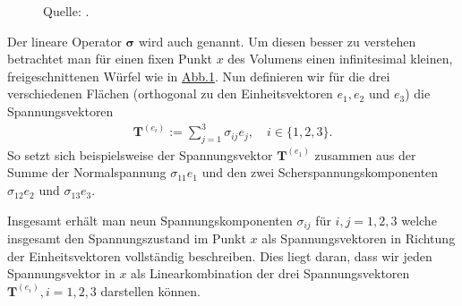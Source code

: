 \documentclass[letterpaper,10pt,german]{jupyterBook}
\let\sphinxpxdimen\pdfpxdimen\else\newdimen\sphinxpxdimen
\begin{document}
\begin{figure}[htbp]
\centering
\capstart

\noindent\sphinxincludegraphics[height=250\sphinxpxdimen]{{stress_tensor_comp}.png}
\caption{Quelle: .}\label{\detokenize{vektoranalysis/tensor:fig-stress-comp}}\end{figure}

\sphinxAtStartPar
Der lineare Operator \(\mathbf{\sigma}\) wird auch  genannt.
Um diesen besser zu verstehen betrachtet man für einen fixen Punkt \(x\) des Volumens einen infinitesimal kleinen, freigeschnittenen Würfel wie in \hyperref[\detokenize{vektoranalysis/tensor:fig-stress-comp}]{Abb.\@ \ref{\detokenize{vektoranalysis/tensor:fig-stress-comp}}}.
Nun definieren wir für die drei verschiedenen Flächen (orthogonal zu den Einheitsvektoren \(e_1, e_2\) und \(e_3\)) die Spannungsvektoren
\begin{equation*}
\begin{split}\mathbf{T}^{(e_i)}:= \sum_{j=1}^3 \sigma_{ij} e_j, \quad i \in \lbrace 1,2,3 \rbrace.\end{split}
\end{equation*}
\sphinxAtStartPar
So setzt sich beispielsweise der Spannungsvektor \(\mathbf{T}^{(e_1)}\) zusammen aus der Summe der Normalspannung \(\sigma_{11} e_1\) und den zwei Scherspannungskomponenten \(\sigma_{12} e_2\) und \(\sigma_{13} e_3\).

\sphinxAtStartPar
Insgesamt erhält man neun Spannungskomponenten \(\sigma_{ij}\) für \(i,j=1,2,3\) welche insgesamt den Spannungszustand im Punkt \(x\) als Spannungsvektoren in Richtung der Einheitsvektoren vollständig beschreiben.
Dies liegt daran, dass wir jeden Spannungsvektor in \(x\) als Linearkombination der drei Spannungsvektoren \(\mathbf{T}^{(e_i)}, i=1,2,3\) darstellen können.
\end{document}
